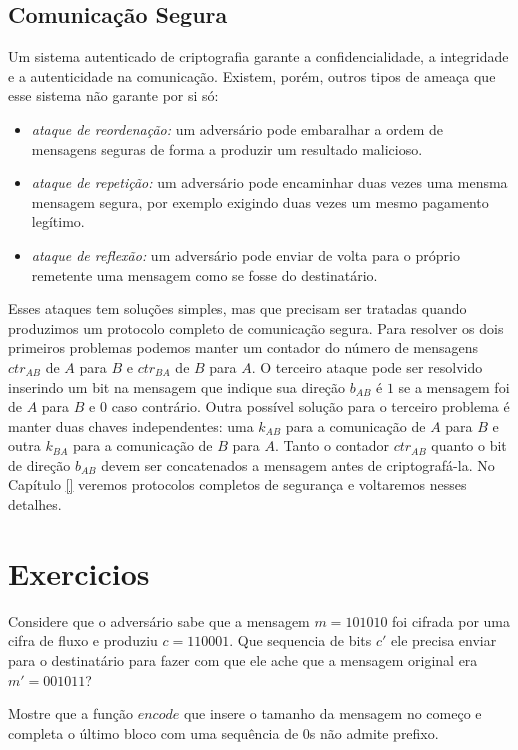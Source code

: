 \subsection{Comunicação Segura}
\label{sec:comunicacao-segura}

Um sistema autenticado de criptografia garante a confidencialidade, a integridade e a autenticidade na comunicação.
Existem, porém, outros tipos de ameaça que esse sistema não garante por si só:
\begin{itemize}
\item {\em ataque de reordenação:} um adversário pode embaralhar a ordem de mensagens seguras de forma a produzir um resultado malicioso.
\item {\em ataque de repetição:} um adversário pode encaminhar duas vezes uma mensma mensagem segura, por exemplo exigindo duas vezes um mesmo pagamento legítimo.
\item {\em ataque de reflexão:} um adversário pode enviar de volta para o próprio remetente uma mensagem como se fosse do destinatário.
\end{itemize}

Esses ataques tem soluções simples, mas que precisam ser tratadas quando produzimos um protocolo completo de comunicação segura.
Para resolver os dois primeiros problemas podemos manter um contador do número de mensagens $ctr_{AB}$ de $A$ para $B$ e $ctr_{BA}$ de $B$ para $A$.
O terceiro ataque pode ser resolvido inserindo um bit na mensagem que indique sua direção $b_{AB}$ é $1$ se a mensagem foi de $A$ para $B$ e $0$ caso contrário.
Outra possível solução para o terceiro problema é manter duas chaves independentes: uma $k_{AB}$ para a comunicação de $A$ para $B$ e outra $k_{BA}$ para a comunicação de $B$ para $A$.
Tanto o contador $ctr_{AB}$ quanto o bit de direção $b_{AB}$ devem ser concatenados a mensagem antes de criptografá-la.
No Capítulo \ref{} veremos protocolos completos de segurança e voltaremos nesses detalhes.

\section{Exercicios}
\label{sec:exercicios}


\begin{exercicio}
  Considere que o adversário sabe que a mensagem $m = 101010$ foi cifrada por uma cifra de fluxo e produziu $c = 110001$.
  Que sequencia de bits $c'$ ele precisa enviar para o destinatário para fazer com que ele ache que a mensagem original era $m' = 001011$?
\end{exercicio}


\begin{exercicio}
  Mostre que a função $encode$ que insere o tamanho da mensagem no começo e completa o último bloco com uma sequência de $0$s não admite prefixo.
\end{exercicio}

